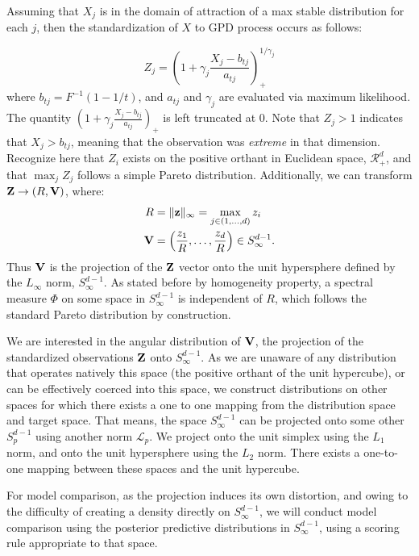 Assuming that $X_j$ is in the domain of attraction of a max stable distribution for each $j$, then
  the standardization of $X$ to GPD process occurs as follows:

\begin{equation}
Z_{j} = \left(1 + \gamma_j\frac{X_{j} - b_{tj}}{a_{tj}}\right)_{+}^{1/\gamma_j}
\end{equation}
where $b_{tj} = F^{-1}(1-1/t)$, and $a_{tj}$ and $\gamma_{j}$ are evaluated via maximum likelihood.
  The quantity $\left(1 + \gamma_j\frac{X_{j} - b_{tj}}{a_{tj}}\right)_+$ is left truncated at 0.
  Note that $Z_j > 1$ indicates that $X_{j} > b_{tj}$, meaning that the observation was
  \emph{extreme} in that dimension.  Recognize here that $Z_i$ exists on the positive orthant in
  Euclidean space, $\mathcal{R}_+^d$, and that $\max_jZ_j$ follows a simple Pareto distribution.
  Additionally, we can transform ${\bf Z} \rightarrow (R, {\bf V})$, where:
\begin{equation}
  \begin{aligned}
    R &= \lVert {\bf z} \rVert_{\infty} = \max_{j \in (1,\ldots,d)} z_i\\
    {\bf V} &= \left(\frac{z_1}{R},\ldots,\frac{z_d}{R}\right) \in S_{\infty}^{d-1}.\\
  \end{aligned}
\end{equation}
  Thus ${\bf V}$ is the projection of the ${\bf Z}$ vector onto the unit hypersphere defined by
  the $L_{\infty}$ norm, $S_{\infty}^{d-1}$.  As stated before by homogeneity property, a spectral
  measure $\Phi$ on some space in $S_{\infty}^{d-1}$ is independent of $R$, which follows the
  standard Pareto distribution by construction.

We are interested in the angular distribution of ${\bf V}$, the projection of the standardized
  observations ${\bf Z}$ onto $S_{\infty}^{d-1}$.  As we are unaware of any distribution that
  operates natively this space (the positive orthant of the unit hypercube), or can be effectively
  coerced into this space, we construct distributions on other spaces for which there exists a
  one to one mapping from the distribution space and target space.  That means, the space
  $S_{\infty}^{d-1}$ can be projected onto some other $S_p^{d-1}$ using another norm $\mathcal{L}_p$.
  We project onto the unit simplex using the $L_1$ norm, and onto the unit hypersphere using the
  $L_2$ norm.  There exists a one-to-one mapping between these spaces and the unit hypercube.

For model comparison, as the projection induces its own distortion, and owing to the difficulty of
  creating a density directly on $S_{\infty}^{d-1}$, we will conduct model comparison using the
  posterior predictive distributions in $S_{\infty}^{d-1}$, using a scoring rule appropriate
  to that space.

